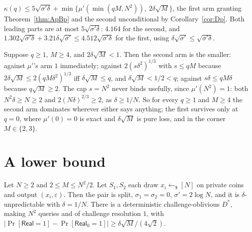 \documentclass{aicr-solution}
\newcommand{\Real}{\mathsf{Real}}
\newcommand{\Prob}[1]{\Pr\!\left[#1\right]}
\begin{document}
\begin{corollary}\label{cor:Dpp}
$\kappa(q) \le 5\sqrt{\sigma'\delta}
+ \min\{\mu'(\min(qM,N^{2})),\ 2\delta\sqrt{M}\}$, the first arm granting
Theorem~\ref{thm:ApBp} and the second unconditional by
Corollary~\ref{cor:Dp}. Both leading parts are at most $5\sqrt{\sigma'\delta}$:
$4.164$ for the second, and
$1.302\sqrt{\sigma'\delta} + 3.21\delta\sqrt{\sigma'} \le 4.512\sqrt{\sigma'\delta}$
for the first, using $\delta\sqrt{\sigma'} \le \sqrt{\sigma'\delta}$.
\end{corollary}

\begin{remark}\label{rem:whicharm}
Suppose $q \ge 1$, $M \ge 4$, and $2\delta\sqrt{M} < 1$. Then the second arm is the
smaller: against $\mu'$'s arm $1$ immediately; against $2(s\delta^{2})^{1/3}$ with
$s \le qM$ because $2\delta\sqrt{M} \le 2(qM\delta^{2})^{1/3}$ iff
$\delta\sqrt{M} \le q$, and $\delta\sqrt{M} < 1/2 < q$; against
$s\delta \le qM\delta$ because $q\sqrt{M} \ge 2$. The cap $s = N^{2}$ never binds
usefully, since $\mu'(N^{2}) = 1$: both $N^{2}\delta \ge N \ge 2$ and
$2(N\delta)^{2/3} \ge 2$, as $\delta \ge 1/N$. So for every $q \ge 1$ and
$M \ge 4$ the second arm dominates wherever either says anything; the first
survives only at $q = 0$, where $\mu'(0) = 0$ is exact and $\delta\sqrt{M}$ is
pure loss, and in the corner $M \in \{2,3\}$.
\end{remark}

\section{A lower bound}\label{sec:lower}

\begin{proposition}\label{prop:F}
Let $N \ge 2$ and $2 \le M \le N^{2}/2$. Let $S_1, S_2$ each draw
$x_i \gets_{\$} [N]$ on private coins and output $(x_i,\varepsilon)$. Then the pair
is split, $\sigma_1 = \sigma_2 = 0$, $\sigma' = 2\log N$, and it is
$\delta$-unpredictable with $\delta = 1/N$. There is a deterministic
challenge-oblivious $D^{*}$, making $N^{2}$ queries and of challenge resolution
$1$, with
$|\Prob{\Real = 1} - \Prob{\Real_0 = 1}| \ge \delta\sqrt{M}/(4\sqrt2)$.
\end{proposition}
\end{document}

